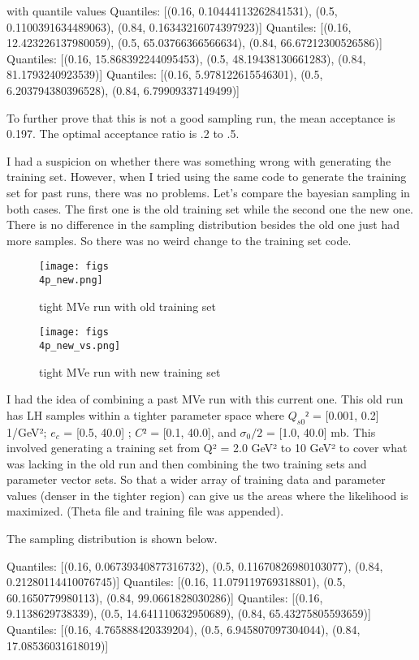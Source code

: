 \documentclass{article}
\begin{document}
with quantile values
Quantiles: [(0.16, 0.10444113262841531), (0.5, 0.1100391634489063), (0.84, 0.16343216074397923)]
Quantiles: [(0.16, 12.423226137980059), (0.5, 65.03766366566634), (0.84, 66.67212300526586)]
Quantiles: [(0.16, 15.868392244095453), (0.5, 48.19438130661283), (0.84, 81.1793240923539)]
Quantiles: [(0.16, 5.978122615546301), (0.5, 6.203794380396528), (0.84, 6.79909337149499)]

To further prove that this is not a good sampling run, the mean acceptance is 0.197. The optimal acceptance ratio is .2 to .5.

I had a suspicion on whether there was something wrong with generating the training set. However, when I tried using the same code to generate the training set for past runs, there was no problems. Let's compare the bayesian sampling in both cases. The first one is the old training set while the second one the new one. There is no difference in the sampling distribution besides the old one just had more samples. So there was no weird change to the training set code.

\begin{figure}[h]
\centering
\texttt{[image: figs\\4p\_new.png]}
\caption{tight MVe run with old training set}
\label{fig:4p_new}
\end{figure}

\begin{figure}[h]
\centering
\texttt{[image: figs\\4p\_new\_vs.png]}
\caption{tight MVe run with new training set}
\label{fig:4p_new_vs}
\end{figure}

I had the idea of combining a past MVe run with this current one. This old run has LH samples within a tighter parameter space where $Q_{s0}²$ = [0.001, 0.2] 1/GeV²; $e_c$ = [0.5, 40.0] ; $C²$ = [0.1, 40.0], and $\sigma_{0}/2$ = [1.0, 40.0] mb. This involved generating a training set from Q² = 2.0 GeV² to 10 GeV² to cover what was lacking in the old run and then combining the two training sets and parameter vector sets. So that a wider array of training data and parameter values (denser in the tighter region) can give us the areas where the likelihood is maximized. (Theta file and training file was appended).

The sampling distribution is shown below. 

Quantiles: [(0.16, 0.06739340877316732), (0.5, 0.11670826980103077), (0.84, 0.21280114410076745)]
Quantiles: [(0.16, 11.079119769318801), (0.5, 60.1650779980113), (0.84, 99.0661828030286)]
Quantiles: [(0.16, 9.1138629738339), (0.5, 14.641110632950689), (0.84, 65.43275805593659)]
Quantiles: [(0.16, 4.765888420339204), (0.5, 6.945807097304044), (0.84, 17.08536031618019)]
\end{document}
